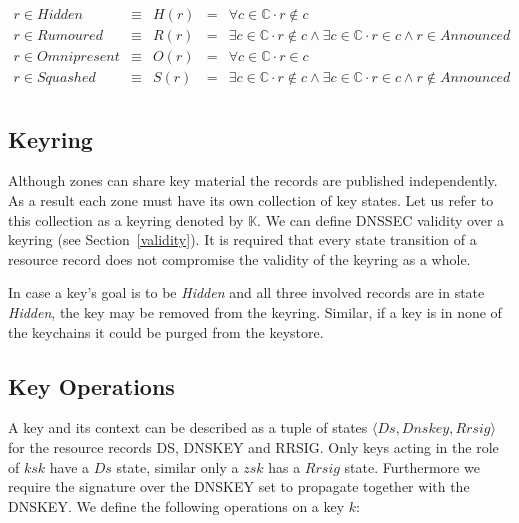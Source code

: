 \documentclass[twoside,english, a4paper]{article}
\begin{document}
\begin{displaymath}
\begin{array}{lllll}
       r\in Hidden      & \equiv & H(r) &=& \forall c \in \mathbb{C} \cdot r \not \in c \\
       r\in Rumoured    & \equiv & R(r) &=& \exists c \in \mathbb{C} \cdot r \not \in c \wedge \exists c \in \mathbb{C} \cdot r\in c \wedge r\in Announced\\
       r\in Omnipresent & \equiv & O(r) &=& \forall c \in \mathbb{C} \cdot r \in c \\
       r\in Squashed    & \equiv & S(r) &=& \exists c \in \mathbb{C} \cdot r \not \in c \wedge \exists c \in \mathbb{C} \cdot r \in c \wedge r \notin Announced \\
\end{array}
\end{displaymath}

\subsection{Keyring}

Although zones can share key material the records are published 
independently. As a result each zone must have its own collection of
key states. Let us refer to this collection as a keyring denoted 
by $\mathbb{K}$. We can
define DNSSEC validity over a keyring (see Section~\ref{validity}).
It is required that every state transition of a resource record does 
not compromise the validity of the keyring as a whole.

In case a key's goal is to be \emph{Hidden} and all three involved
records are in state \emph{Hidden}, the key may be removed from the
keyring. Similar, if a key is in none of the keychains it could be
purged from the keystore.

\subsection{Key Operations}

A key and its context can be described as a tuple of states $\langle 
Ds,Dnskey,Rrsig\rangle$ for the resource records DS, DNSKEY and RRSIG.
Only keys acting in the role of $ksk$ have a $Ds$ state, similar
only a $zsk$ has a $Rrsig$ state. Furthermore we require the signature
over the DNSKEY set to propagate together with the DNSKEY.
We define the following operations on a key $k$:
\end{document}
